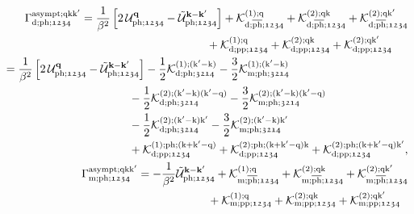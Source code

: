 \documentclass[../../main.tex]{subfiles}
\begin{document}
\begin{subequations}
\begin{align}
\begin{split}
	\Gamma^{\text{asympt};\q\k\kp}_{\dens;\ph;\mathfrak{1234}}&=\frac{1}{\beta^2}\left [2\,\mathcal{U}^{\vv{q}}_{\ph;\mathfrak{1234}} - \tilde{\mathcal{U}}^{\vv{k}-\vv{k}'}_{\ph;\mathfrak{1234}}\right ] + \mathcal{K}^{(1);\q}_{\dens;\phbar;\mathfrak{1234}} + \mathcal{K}^{(2);\q\k}_{\dens;\phbar;\mathfrak{1234}}+\mathcal{K}^{(2);\q\kp}_{\dens;\phbar;\mathfrak{1234}}\\
	&\qquad\qquad\qquad\qquad\qquad\quad\,+\mathcal{K}^{(1);\q}_{\dens;\pp;\mathfrak{1234}} + \mathcal{K}^{(2);\q\k}_{\dens;\pp;\mathfrak{1234}}+\mathcal{K}^{(2);\q\kp}_{\dens;\pp;\mathfrak{1234}}
\end{split}\\
\begin{split}
	&=\frac{1}{\beta^2}\left [2\,\mathcal{U}^{\vv{q}}_{\ph;\mathfrak{1234}} - \tilde{\mathcal{U}}^{\vv{k}-\vv{k}'}_{\ph;\mathfrak{1234}}\right ]-\frac12\mathcal{K}^{(1);(\kp-\k)}_{\dens;\ph;\mathfrak{3214}}-\frac32\mathcal{K}^{(1);(\kp-\k)}_{\magn;\ph;\mathfrak{3214}}\\
	&\qquad\qquad\qquad\qquad\qquad\quad\,-\frac12\mathcal{K}^{(2);(\kp-\k)(\kp-\q)}_{\dens;\ph;\mathfrak{3214}}-\frac32\mathcal{K}^{(2);(\kp-\k)(\kp-\q)}_{\magn;\ph;\mathfrak{3214}}\\
	&\qquad\qquad\qquad\qquad\qquad\quad\,-\frac12\mathcal{K}^{(2);(\kp-\k)\kp}_{\dens;\ph;\mathfrak{3214}}-\frac32\mathcal{K}^{(2);(\kp-\k)\kp}_{\magn;\ph;\mathfrak{3214}}\\
	&\qquad\qquad\qquad\qquad\qquad\quad\,+\mathcal{K}^{(1);\ph;(\k+\kp-\q)}_{\dens;\pp;\mathfrak{1234}} + \mathcal{K}^{(2);\ph;(\k+\kp-\q)\k}_{\dens;\pp;\mathfrak{1234}}+\mathcal{K}^{(2);\ph;(\k+\kp-\q)\kp}_{\dens;\pp;\mathfrak{1234}},
\end{split}\\
\begin{split}
	\Gamma^{\text{asympt};\q\k\kp}_{\magn;\ph;\mathfrak{1234}}&=-\frac{1}{\beta^2}\tilde{\mathcal{U}}^{\vv{k}-\vv{k}'}_{\ph;\mathfrak{1234}} + \mathcal{K}^{(1);\q}_{\magn;\phbar;\mathfrak{1234}} + \mathcal{K}^{(2);\q\k}_{\magn;\phbar;\mathfrak{1234}}+\mathcal{K}^{(2);\q\kp}_{\magn;\phbar;\mathfrak{1234}}\\
	&\qquad\qquad\qquad\:+\mathcal{K}^{(1);\q}_{\magn;\pp;\mathfrak{1234}} + \mathcal{K}^{(2);\q\k}_{\magn;\pp;\mathfrak{1234}}+\mathcal{K}^{(2);\q\kp}_{\magn;\pp;\mathfrak{1234}}
\end{split}\\

\end{align}
\end{subequations}
\end{document}
